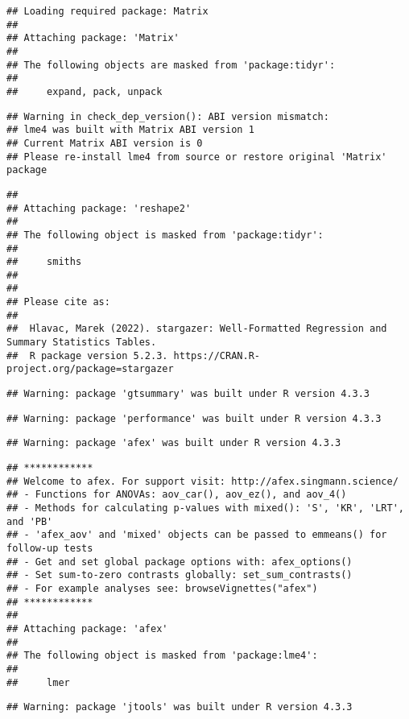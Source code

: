 \documentclass[
]{article}
\begin{document}
\begin{verbatim}
## Loading required package: Matrix
## 
## Attaching package: 'Matrix'
## 
## The following objects are masked from 'package:tidyr':
## 
##     expand, pack, unpack
\end{verbatim}

\begin{verbatim}
## Warning in check_dep_version(): ABI version mismatch: 
## lme4 was built with Matrix ABI version 1
## Current Matrix ABI version is 0
## Please re-install lme4 from source or restore original 'Matrix' package
\end{verbatim}

\begin{verbatim}
## 
## Attaching package: 'reshape2'
## 
## The following object is masked from 'package:tidyr':
## 
##     smiths
## 
## 
## Please cite as: 
## 
##  Hlavac, Marek (2022). stargazer: Well-Formatted Regression and Summary Statistics Tables.
##  R package version 5.2.3. https://CRAN.R-project.org/package=stargazer
\end{verbatim}

\begin{verbatim}
## Warning: package 'gtsummary' was built under R version 4.3.3
\end{verbatim}

\begin{verbatim}
## Warning: package 'performance' was built under R version 4.3.3
\end{verbatim}

\begin{verbatim}
## Warning: package 'afex' was built under R version 4.3.3
\end{verbatim}

\begin{verbatim}
## ************
## Welcome to afex. For support visit: http://afex.singmann.science/
## - Functions for ANOVAs: aov_car(), aov_ez(), and aov_4()
## - Methods for calculating p-values with mixed(): 'S', 'KR', 'LRT', and 'PB'
## - 'afex_aov' and 'mixed' objects can be passed to emmeans() for follow-up tests
## - Get and set global package options with: afex_options()
## - Set sum-to-zero contrasts globally: set_sum_contrasts()
## - For example analyses see: browseVignettes("afex")
## ************
## 
## Attaching package: 'afex'
## 
## The following object is masked from 'package:lme4':
## 
##     lmer
\end{verbatim}

\begin{verbatim}
## Warning: package 'jtools' was built under R version 4.3.3
\end{verbatim}
\end{document}

